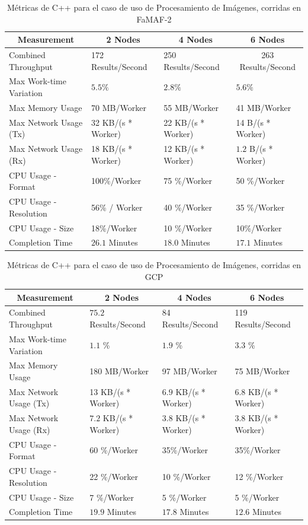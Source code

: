 \documentclass[11pt]{article}
\newcommand{\ipcap}[2]{\caption{Métricas de #1 para el caso de uso de Procesamiento de Imágenes, corridas en #2}}
\begin{document}
\begin{table}[H]
\centering
\begin{tabular}{|l|l|l|l|}
\hline
\multicolumn{1}{|c|}{Measurement} & \multicolumn{1}{c|}{2 Nodes} & \multicolumn{1}{c|}{4 Nodes} & \multicolumn{1}{c|}{6 Nodes} \\ \hline
Combined Throughput & 172 Results/Second & 250 Results/Second & \multicolumn{1}{c|}{263 Results/Second} \\ \hline
Max Work-time Variation & $5.5\%$& $2.8\%$& $5.6\%$\\ \hline
Max Memory Usage & 70 MB/Worker & 55 MB/Worker & 41 MB/Worker \\ \hline
Max Network Usage (Tx) & 32 KB/(s * Worker) & 22 KB/(s * Worker) & 14 B/(s * Worker) \\ \hline
Max Network Usage (Rx) & 18 KB/(s * Worker) & 12 KB/(s * Worker) & $1.2$ B/(s * Worker) \\ \hline
CPU Usage - Format & 100\%/Worker & 75 \%/Worker & 50 \%/Worker \\ \hline
CPU Usage - Resolution & 56\% / Worker & 40 \%/Worker & 35 \%/Worker \\ \hline
CPU Usage - Size & 18\%/Worker & 10 \%/Worker & 10\%/Worker \\ \hline
Completion Time & $26.1$ Minutes & $18.0$ Minutes & $17.1$ Minutes \\ \hline
\end{tabular}
\ipcap{C++}{FaMAF-2}
\end{table}

\begin{table}[H]
\centering
\begin{tabular}{|l|l|l|l|}
\hline
\multicolumn{1}{|c|}{Measurement} & \multicolumn{1}{c|}{2 Nodes} & \multicolumn{1}{c|}{4 Nodes} & \multicolumn{1}{c|}{6 Nodes} \\ \hline
Combined Throughput & $75.2$ Results/Second & 84 Results/Second & 119 Results/Second \\ \hline
Max Work-time Variation & $1.1$ \% & $1.9$ \% & $3.3$ \% \\ \hline
Max Memory Usage & 180 MB/Worker & 97 MB/Worker & 75 MB/Worker \\ \hline
Max Network Usage (Tx) & 13 KB/(s * Worker) & $6.9$ KB/(s * Worker) & $6.8$ KB/(s * Worker) \\ \hline
Max Network Usage (Rx) & $7.2$ KB/(s * Worker) & $3.8$ KB/(s * Worker) & $3.8$ KB/(s * Worker) \\ \hline
CPU Usage - Format & 60 \%/Worker & 35\%/Worker & 35\%/Worker \\ \hline
CPU Usage - Resolution & 22 \%/Worker & 10 \%/Worker & 12 \%/Worker \\ \hline
CPU Usage - Size & 7 \%/Worker & 5 \%/Worker & 5 \%/Worker \\ \hline
Completion Time & $19.9$ Minutes & $17.8$ Minutes & $12.6$ Minutes \\ \hline
\end{tabular}
\ipcap{C++}{GCP}
\end{table}
\end{document}
